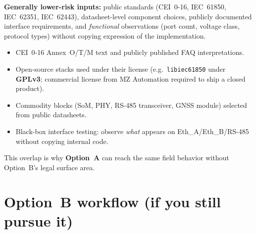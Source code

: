 \documentclass[11pt,a4paper]{article}
\newcommand{\file}[1]{\texttt{#1}}
\begin{document}
\begin{center}
\begin{minipage}{0.95\linewidth}
\colorbox{okbg}{%
  \parbox{\dimexpr\linewidth-2\fboxsep\relax}{%
    \small
    \textbf{\textcolor{okgreen}{Generally lower-risk inputs:}}
    public standards (CEI~0-16, IEC~61850, IEC~62351, IEC~62443), datasheet-level component choices,
    publicly documented interface requirements, and \emph{functional} observations (port count, voltage class, protocol types)
    without copying expression of the implementation.
  }%
}
\end{minipage}
\end{center}

\begin{itemize}[leftmargin=*]
  \item CEI~0-16 Annex~O/T/M text and publicly published FAQ interpretations.
  \item Open-source stacks used under their license (e.g.\ \file{libiec61850} under \textbf{GPLv3}; commercial license from MZ Automation required to ship a closed product).
  \item Commodity blocks (SoM, PHY, RS-485 transceiver, GNSS module) selected from public datasheets.
  \item Black-box interface testing: observe \emph{what} appears on Eth\_A/Eth\_B/RS-485 without copying internal code.
\end{itemize}

This overlap is why \textbf{Option~A} can reach the same field behavior without Option~B's legal surface area.

\section{Option~B workflow (if you still pursue it)}
\end{document}
